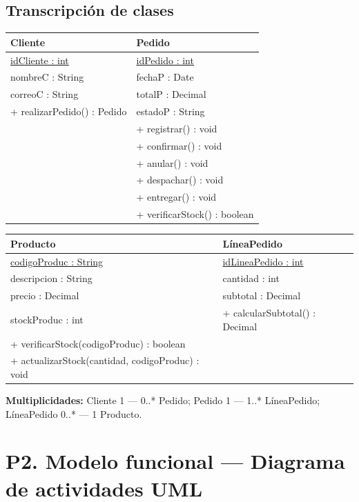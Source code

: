 \documentclass[11pt,a4paper]{article}
\begin{document}
	\subsection*{Transcripción de clases }
	\begin{center}
		\begin{tabular}{@{}p{5.4cm}p{5.4cm}@{}}
			\toprule
			\textbf{Cliente} & \textbf{Pedido} \\
			\midrule
			\underline{idCliente : int} & \underline{idPedido : int} \\
			nombreC : String & fechaP : Date \\
			correoC : String & totalP : Decimal \\
			+ realizarPedido() : Pedido & estadoP : String \\
			& + registrar() : void \\
			& + confirmar() : void \\
			& + anular() : void \\
			& + despachar() : void \\
			& + entregar() : void \\
			& + verificarStock() : boolean \\
			\bottomrule
		\end{tabular}
		
		\vspace{3.6cm}
		\begin{tabular}{@{}p{5.4cm}p{5.4cm}@{}}
			\toprule
			\textbf{Producto} & \textbf{LíneaPedido} \\
			\midrule
			\underline{codigoProduc : String} & \underline{idLineaPedido : int} \\
			descripcion : String & cantidad : int \\
			precio : Decimal & subtotal : Decimal \\
			stockProduc : int & + calcularSubtotal() : Decimal \\
			+ verificarStock(codigoProduc) : boolean & \\
			+ actualizarStock(cantidad, codigoProduc) : void & \\
			\bottomrule
		\end{tabular}
	\end{center}
	
	\noindent\textbf{Multiplicidades:} Cliente 1 --- 0..* Pedido; Pedido 1 --- 1..* LíneaPedido; LíneaPedido 0..* --- 1 Producto.
	
	\section{P2. Modelo funcional --- Diagrama de actividades UML}
		
\end{document}
